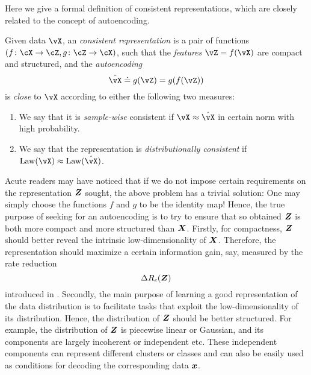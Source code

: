 \documentclass[\toplevelprefix/book-main.tex]{subfiles}
\begin{document}
Here we give a formal definition of consistent representations, which
are closely related to the concept of autoencoding. %
\begin{definition}\label{def:bidirectional_rep}
  Given data \(\vX\), an \textit{consistent representation} is a pair
  of functions \((f \colon \cX \to \cZ, g \colon \cZ \to \cX)\), such
  that the \textit{features} \(\vZ = f(\vX)\) are compact and
  structured, and the \textit{autoencoding} \[\hat{\vX} \doteq g(\vZ)
  = g(f(\vZ))\] is \textit{close} to \(\vX\) according to either the
  following two measures:
  \begin{enumerate}
    \item We say that it is \textit{sample-wise} consistent if \(\vX
      \approx \hat{\vX}\) in certain norm with high probability.
    \item We say that the representation is \textit{distributionally
      consistent} if \(\Law(\vX) \approx \Law(\hat{\vX})\).
  \end{enumerate}
\end{definition}

Acute readers may have noticed that if we do not impose certain
requirements on the representation $\bm{Z}$ sought, the above problem has
a trivial solution: One may simply choose the functions $f$ and $g$
to be the identity map! Hence, the true purpose of seeking for an
autoencoding is to try to ensure that so obtained $\bm{Z}$ is both more
compact and more structured than $\bm{X}$. Firstly, for compactness, $\bm{Z}$
should better reveal the intrinsic low-dimensionality of $\bm{X}$.
Therefore, the representation should maximize a certain information
gain, say, measured by the rate reduction
\begin{equation}
  \Delta R_{\epsilon}(\bm{Z})
\end{equation}
introduced in . Secondly, the main purpose of
learning a good representation of the data distribution is to
facilitate tasks that exploit the low-dimensionality of its
distribution. Hence, the distribution of $\bm{Z}$ should be better
structured. For example, the distribution of $\bm{Z}$ is piecewise linear
or Gaussian, and its components are largely incoherent or independent
etc. These independent components can represent different clusters or
classes and can also be easily used as conditions for decoding the
corresponding data $\bm{x}$.
\end{document}

